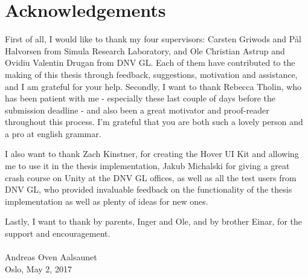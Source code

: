 \chapter*{Acknowledgements}  
First of all, I would like to thank my four supervisors: Carsten Griwods and Pål Halvorsen from Simula Research Laboratory, and Ole Christian Astrup and Ovidiu Valentin Drugan 
from DNV GL. Each of them have contributed to the making of this thesis through feedback, suggestions, motivation and assistance, and I am grateful for your help.
Secondly, I want to thank Rebecca Tholin, who has been patient with me - especially these last couple of days before the submission deadline - and also
been a great motivator and proof-reader throughout this process. I'm grateful that you are both such a lovely person and a pro at english grammar.

I also want to thank Zach Kinstner, for creating the Hover UI Kit and allowing me to use it in the thesis implementation,  
Jakub Michalski for giving a great crash course on Unity at the DNV GL offices, as well as all the test users from DNV GL, 
who provided invaluable feedback on the functionality of the thesis implementation as well as plenty of ideas for new ones.

Lastly, I want to thank by parents, Inger and Ole, and by brother Einar, for the support and encouragement. \\\\


\noindent
Andreas Oven Aalsaunet \\
Oslo, May 2, 2017






